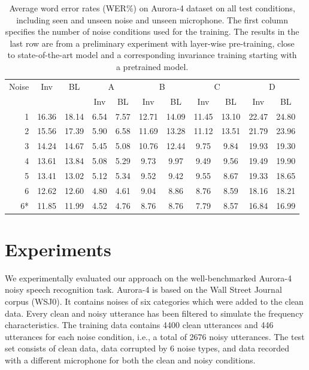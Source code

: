 \documentclass[a4paper]{article}
\begin{document}
\begin{table}[t]
    \centering
    \caption{Average word error rates (WER\%) on Aurora-4 dataset on all test conditions,
        including seen and unseen noise and unseen microphone. The first column
        specifies the number of noise conditions used for the training. The
        results in the last row are from a preliminary experiment with
        layer-wise pre-training, close to state-of-the-art
        model and a corresponding invariance training starting with a pretrained model.}
    \label{tab:results}
    \begin{tabular}{r|cc||cc|cc|cc|cc}
        Noise       &Inv&BL&  \multicolumn{2}{c|}{A} & \multicolumn{2}{c|}{B} & \multicolumn{2}{c|}{C} & \multicolumn{2}{c}{D}\\
               & & &  Inv & BL & Inv & BL & Inv & BL & Inv & BL\\
    \hline
    1           &16.36        &18.14 &6.54&7.57    &12.71& 14.09   & 11.45&   13.10    & 22.47 &   24.80    \\
    2           &15.56        &17.39 &5.90&  6.58 &   11.69   &13.28   &11.12   &13.51   &21.79   &23.96 \\
    3           &14.24        &14.67 &5.45 & 5.08&    10.76&   12.44&   9.75&    9.84 &   19.93&   19.30\\
    4           &13.61        &13.84 & 5.08 &5.29    &9.73    &9.97    &9.49    &9.56    &19.49   &19.90\\         
    5           &13.41        &13.02 & 5.12 &5.34    &9.52    &9.42    &9.55    &8.67    &19.33   &18.65\\         
    6           &12.62        &12.60 & 4.80 &4.61    &9.04    &8.86    &8.76    &8.59    &18.16   &18.21\\
    \hline\hline
    6* &11.85        &11.99    &4.52    &4.76    &8.76    &8.76    &7.79    &8.57    &16.84&    16.99
    \end{tabular}
\end{table}

\section{Experiments}
\label{sec:experiments}
We experimentally evaluated our approach   
on the well-benchmarked Aurora-4 \citep{parihar2002aurora} noisy speech recognition task. Aurora-4
is based on the Wall Street Journal corpus (WSJ0). It contains noises of 
six categories which were added to the clean data. Every clean and noisy
utterance has been 
filtered to simulate the frequency characteristics. The training
data contains 4400 clean utterances and 446 utterances for each noise condition,
i.e., a total of 2676 noisy utterances.
The test set consists of clean data, data corrupted by 6 noise types, and data 
recorded with a different microphone for both the clean and noisy conditions.
\end{document}
